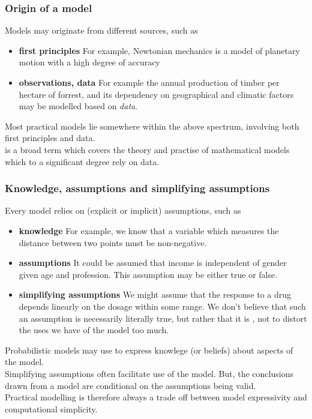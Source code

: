 \begin{frame}
\frametitle{Origin of a model}

Models may originate from different sources, such as
\begin{itemize}
\item {\bf first principles} For example, Newtonian mechanics is a model of planetary motion with a high degree of accuracy
\item {\bf observations, data} For example the annual production of timber per hectare of forrest, and its dependency on geographical and climatic factors may be modelled based on \emph{data}.
\end{itemize}

Most practical models lie somewhere within the  above spectrum, involving both first principles and data.\\[1ex]

 is a broad term which covers the theory and practise of mathematical models which to a significant degree rely on data.  
\end{frame}



\begin{frame}
\frametitle{Knowledge, assumptions and simplifying assumptions}

Every model relies on (explicit or implicit) assumptions, such as
\begin{itemize}
\item {\bf knowledge} For example, we know that a variable which measures the distance between two points must be non-negative.
\item {\bf assumptions} It could be assumed that income is independent of gender given age and profession. This assumption may be either true or false. 
\item {\bf simplifying assumptions} We might assume that the response to a drug depends linearly on the dosage within some range. We don't believe that such an assumption is necessarily literally true, but rather that it is , not to distort the uses we have of the model too much.
\end{itemize}

Probabilistic models may use  to express knowlege (or beliefs) about aspects of the model.\\[1ex] 

Simplifying assumptions often facilitate use of the model. But, the conclusions drawn from a model are conditional on the assumptions being valid.\\[1ex]

Practical modelling is therefore always a trade off between model expressivity  and computational simplicity.
\end{frame}


